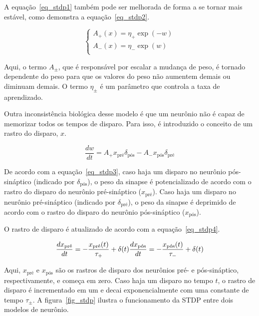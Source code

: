 A equação~\ref{eq_stdp1} também pode ser melhorada de forma a se tornar mais estável, como demonstra a equação~\ref{eq_stdp2}.

\begin{equation}
\label{eq_stdp2}
\begin{cases}
    A_{+}(x) = \eta_{+} \exp(-w)\\
    A_{-}(x) = \eta_{-} \exp(w)\\
\end{cases}
\end{equation}

Aqui, o termo $A_{\pm}$, que é responsável por escalar a mudança de peso, é tornado dependente do peso para que os valores do peso
não aumentem demais ou diminuam demais. O termo $\eta_{\pm}$ é um parâmetro que controla a taxa de aprendizado.

Outra inconsistência biológica desse modelo é que um neurônio não é capaz de memorizar todos os tempos de disparo. Para isso, é
introduzido o conceito de um rastro do disparo, $x$.

\begin{equation}
\label{eq_stdp3}
\frac{dw}{dt} = A_{+} x_{\text{pré}} \delta_{\text{pós}} - A_{-} x_{\text{pós}} \delta_{\text{pré}}
\end{equation}

De acordo com a equação~\ref{eq_stdp3}, caso haja um disparo no neurônio pós-sináptico (indicado por $\delta_{\text{pós}}$), o peso da
sinapse é potencializado de acordo com o rastro do disparo do neurônio pré-sináptico ($x_{\text{pré}}$). Caso haja um disparo no
neurônio pré-sináptico (indicado por $\delta_{\text{pré}}$), o peso da sinapse é deprimido de acordo com o rastro do disparo do neurônio
pós-sináptico ($x_{\text{pós}}$).

O rastro de disparo é atualizado de acordo com a equação~\ref{eq_stdp4}.

\begin{equation}
\label{eq_stdp4}
\frac{dx_{\text{\text{pré}}}}{dt} = -\frac{x_{\text{pré}}(t)}{\tau_{+}}+\delta(t) \\
\frac{dx_{\text{pós}}}{dt} = -\frac{x_{\text{pós}}(t)}{\tau_{-}}+\delta(t)
\end{equation}

Aqui, $x_{\text{pré}}$ e $x_{\text{pós}}$ são os rastros de disparo dos neurônios pré- e pós-sináptico, respectivamente, e começa em zero. Caso
haja um disparo no tempo $t$, o rastro de disparo é incrementado em um e decai exponencialmente com uma constante de tempo
$\tau_{\pm}$. A figura~\ref{fig_stdp} ilustra o funcionamento da STDP entre dois modelos de neurônio.

